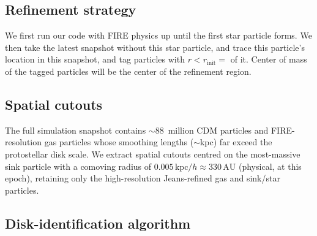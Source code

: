 \documentclass[twocolumn,11pt]{article}
\newcommand{\AU}{\,\mathrm{AU}}
\newcommand{\kpc}{\,\mathrm{kpc}}
\begin{document}
\subsection{Refinement strategy}
\label{sec:refinement}

We first run our code with FIRE physics up until the first star particle forms.
We then take the latest snapshot without this star particle, and trace this particle's
location in this snapshot, and tag particles with
$r < r_\text{init} = $ %
of it. Center of mass of the tagged particles will be the center of the refinement
region.


\subsection{Spatial cutouts}
\label{sec:cutouts}

The full simulation snapshot contains $\sim 88$~million CDM particles
and FIRE-resolution gas particles whose smoothing lengths
($\sim\!$kpc) far exceed the protostellar disk scale.
We extract spatial cutouts centred on the most-massive sink particle with
a comoving radius of $0.005\kpc/h \approx 330\AU$ (physical, at this epoch),
retaining only the high-resolution Jeans-refined gas
and sink/star particles.


\subsection{Disk-identification algorithm}
\label{sec:diskid}
\end{document}
